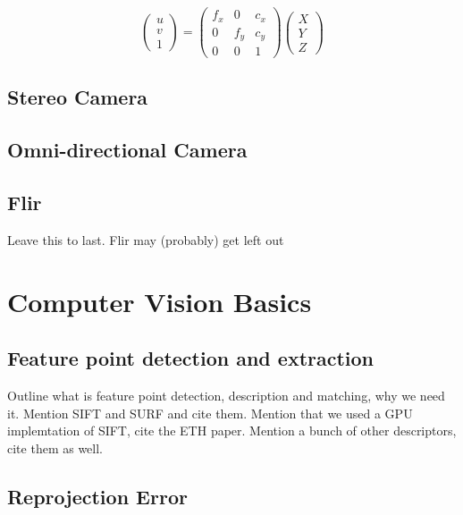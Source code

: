 
\begin{equation}
 \begin{pmatrix}
  u \\
  v \\
  1 
 \end{pmatrix} =
 \begin{pmatrix}
  f_x & 0 & c_x \\
  0 & f_y & c_y \\
  0 & 0   & 1 
 \end{pmatrix}
 \begin{pmatrix}
  X \\ Y \\ Z
 \end{pmatrix}
\end{equation}


\subsection{Stereo Camera}

\subsection{Omni-directional Camera}


\subsection{Flir}
Leave this to last.  Flir may (probably) get left out

\section{Computer Vision Basics}

\subsection{Feature point detection and extraction}
\label{subsec:features}

Outline what is feature point detection, description and matching, why we need it.  Mention SIFT and SURF and cite them.  Mention that we used a GPU implemtation of SIFT, cite the ETH paper. Mention a bunch of other descriptors, cite them as well.

\subsection{Reprojection Error}

